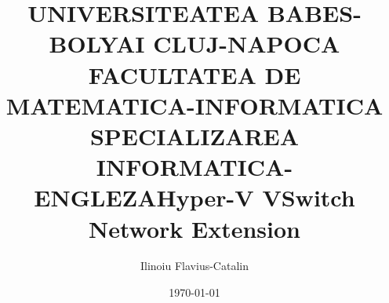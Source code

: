 \title{UNIVERSITEATEA BABES-BOLYAI CLUJ-NAPOCA FACULTATEA DE MATEMATICA-INFORMATICA SPECIALIZAREA INFORMATICA-ENGLEZA}
\title{Hyper-V VSwitch Network Extension}
\author{Ilinoiu Flavius-Catalin}
\date{\today}
\maketitle